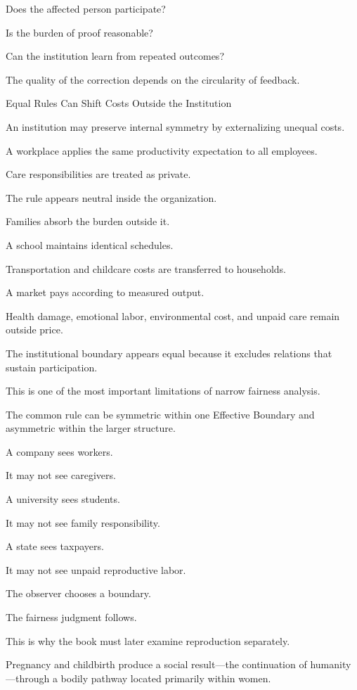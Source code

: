 Does the affected person participate?

Is the burden of proof reasonable?

Can the institution learn from repeated outcomes?

The quality of the correction depends on the circularity of feedback.

Equal Rules Can Shift Costs Outside the Institution

An institution may preserve internal symmetry by externalizing unequal costs.

A workplace applies the same productivity expectation to all employees.

Care responsibilities are treated as private.

The rule appears neutral inside the organization.

Families absorb the burden outside it.

A school maintains identical schedules.

Transportation and childcare costs are transferred to households.

A market pays according to measured output.

Health damage, emotional labor, environmental cost, and unpaid care remain outside price.

The institutional boundary appears equal because it excludes relations that sustain participation.

This is one of the most important limitations of narrow fairness analysis.

The common rule can be symmetric within one Effective Boundary and asymmetric within the larger structure.

A company sees workers.

It may not see caregivers.

A university sees students.

It may not see family responsibility.

A state sees taxpayers.

It may not see unpaid reproductive labor.

The observer chooses a boundary.

The fairness judgment follows.

This is why the book must later examine reproduction separately.

Pregnancy and childbirth produce a social result—the continuation of humanity—through a bodily pathway located primarily within women.

